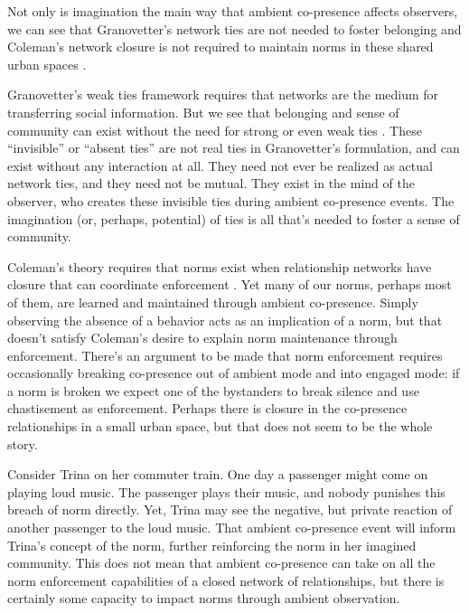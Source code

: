 \documentclass[12pt]{article}
\begin{document}
Not only is imagination the main way that ambient co-presence affects observers, we can see that Granovetter's network ties are not needed to foster belonging and Coleman's network closure is not required to maintain norms in these shared urban spaces \citep{granovetter1973, coleman1988}.

Granovetter's weak ties framework requires that networks are the medium for transferring social information. But we see that belonging and sense of community can exist without the need for strong or even weak ties \citep{zahnow2025comfort, blokland2014}. These ``invisible'' or ``absent ties'' are not real ties in Granovetter's formulation, and can exist without any interaction at all. They need not ever be realized as actual network ties, and they need not be mutual. They exist in the mind of the observer, who creates these invisible ties during ambient co-presence events. The imagination (or, perhaps, potential) of ties is all that's needed to foster a sense of community.

Coleman's theory requires that norms exist when relationship networks have closure that can coordinate enforcement \citep{coleman1988}. Yet many of our norms, perhaps most of them, are learned and maintained through ambient co-presence. Simply observing the absence of a behavior acts as an implication of a norm, but that doesn't satisfy Coleman's desire to explain norm maintenance through enforcement. There's an argument to be made that norm enforcement requires occasionally breaking co-presence out of ambient mode and into engaged mode: if a norm is broken we expect one of the bystanders to break silence and use chastisement as enforcement. Perhaps there is closure in the co-presence relationships in a small urban space, but that does not seem to be the whole story.

Consider Trina on her commuter train. One day a passenger might come on playing loud music. The passenger plays their music, and nobody punishes this breach of norm directly. Yet, Trina may see the negative, but private reaction of another passenger to the loud music. That ambient co-presence event will inform Trina's concept of the norm, further reinforcing the norm in her imagined community. This does not mean that ambient co-presence can take on all the norm enforcement capabilities of a closed network of relationships, but there is certainly some capacity to impact norms through ambient observation.


\end{document}
